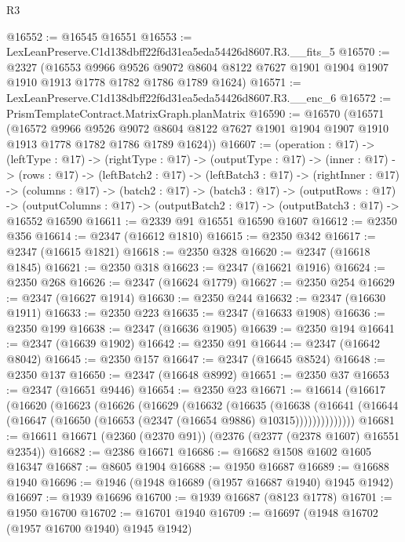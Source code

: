 \begin{lexlean}{R3}
\begin{coremodule}
@16552 := @16545 @16551
@16553 := LexLeanPreserve.C1d138dbff22f6d31ea5eda54426d8607.R3.__fits_5
@16570 := @2327
    (@16553
      @9966
      @9526
      @9072
      @8604
      @8122
      @7627
      @1901
      @1904
      @1907
      @1910
      @1913
      @1778
      @1782
      @1786
      @1789
      @1624)
@16571 := LexLeanPreserve.C1d138dbff22f6d31ea5eda54426d8607.R3.__enc_6
@16572 := PrismTemplateContract.MatrixGraph.planMatrix
@16590 := @16570
    (@16571
      (@16572
        @9966
        @9526
        @9072
        @8604
        @8122
        @7627
        @1901
        @1904
        @1907
        @1910
        @1913
        @1778
        @1782
        @1786
        @1789
        @1624))
@16607 := (operation : @17) ->
  (leftType : @17) ->
  (rightType : @17) ->
  (outputType : @17) ->
  (inner : @17) ->
  (rows : @17) ->
  (leftBatch2 : @17) ->
  (leftBatch3 : @17) ->
  (rightInner : @17) ->
  (columns : @17) ->
  (batch2 : @17) ->
  (batch3 : @17) ->
  (outputRows : @17) ->
  (outputColumns : @17) -> (outputBatch2 : @17) -> (outputBatch3 : @17) -> @16552 @16590
@16611 := @2339 @91 @16551 @16590 @1607
@16612 := @2350 @356
@16614 := @2347 (@16612 @1810)
@16615 := @2350 @342
@16617 := @2347 (@16615 @1821)
@16618 := @2350 @328
@16620 := @2347 (@16618 @1845)
@16621 := @2350 @318
@16623 := @2347 (@16621 @1916)
@16624 := @2350 @268
@16626 := @2347 (@16624 @1779)
@16627 := @2350 @254
@16629 := @2347 (@16627 @1914)
@16630 := @2350 @244
@16632 := @2347 (@16630 @1911)
@16633 := @2350 @223
@16635 := @2347 (@16633 @1908)
@16636 := @2350 @199
@16638 := @2347 (@16636 @1905)
@16639 := @2350 @194
@16641 := @2347 (@16639 @1902)
@16642 := @2350 @91
@16644 := @2347 (@16642 @8042)
@16645 := @2350 @157
@16647 := @2347 (@16645 @8524)
@16648 := @2350 @137
@16650 := @2347 (@16648 @8992)
@16651 := @2350 @37
@16653 := @2347 (@16651 @9446)
@16654 := @2350 @23
@16671 := @16614
    (@16617
      (@16620
        (@16623
          (@16626
            (@16629
              (@16632
                (@16635
                  (@16638
                    (@16641
                      (@16644 (@16647 (@16650 (@16653 (@2347 (@16654 @9886) @10315))))))))))))))
@16681 := @16611 @16671 (@2360 (@2370 @91)) (@2376 (@2377 (@2378 @1607) @16551 @2354))
@16682 := @2386 @16671
@16686 := @16682 @1508 @1602 @1605 @16347
@16687 := @8605 @1904
@16688 := @1950 @16687
@16689 := @16688 @1940
@16696 := @1946 (@1948 @16689 (@1957 @16687 @1940) @1945 @1942)
@16697 := @1939 @16696
@16700 := @1939 @16687 (@8123 @1778)
@16701 := @1950 @16700
@16702 := @16701 @1940
@16709 := @16697 (@1948 @16702 (@1957 @16700 @1940) @1945 @1942)

\end{coremodule}
\end{lexlean}
